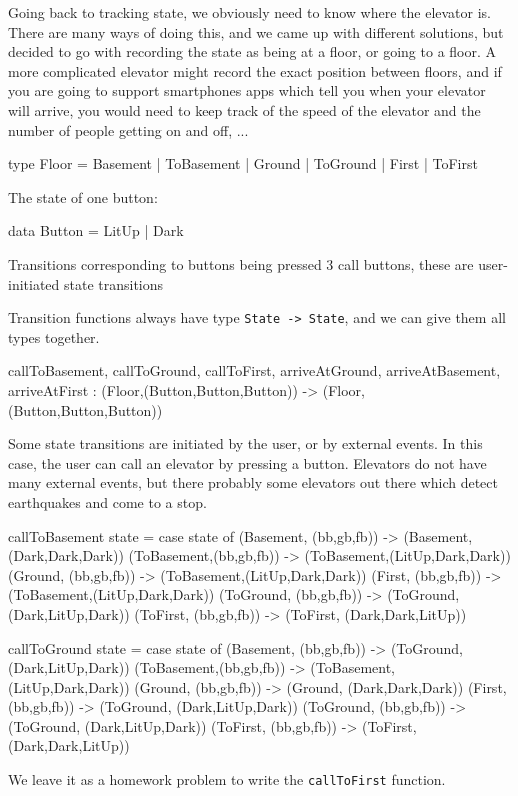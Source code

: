 \documentclass[12pt]{amsbook}
\begin{document}
\medskip

Going back to tracking state, we obviously need to know where the 
elevator is.  
There are many ways of doing this, and we came up with
different solutions, but decided to go with
recording the state as being at a floor, or going to a floor.
A more complicated elevator might record the exact position between
floors, 
and if you are going to support smartphones apps which tell you 
when your elevator will arrive, 
you would need to keep track of the speed of the elevator 
and the number of people getting on and off, ...
\vspace{-12pt}
\begin{code}
type Floor = Basement
           | ToBasement 
           | Ground 
           | ToGround
           | First
           | ToFirst
\end{code}

The state of one button:
\vspace{-12pt}
\begin{code}
data Button = LitUp | Dark
\end{code}

Transitions corresponding to buttons being pressed
3 call buttons, these are user-initiated state transitions

Transition functions always have type \verb|State -> State|,
and we can give them all types together.
\vspace{-12pt}
\begin{code}
callToBasement, callToGround, callToFirst, arriveAtGround, arriveAtBasement, arriveAtFirst
  : (Floor,(Button,Button,Button)) -> (Floor,(Button,Button,Button))
\end{code}

Some state transitions are initiated by the user, or by external events.
In this case, the user can call an elevator by pressing a button.
Elevators do not have many external events, but there probably some elevators
out there which detect earthquakes and come to a stop.
\vspace{-12pt}
\begin{code}
callToBasement state = case state of
  (Basement,  (bb,gb,fb))  -> (Basement,  (Dark,Dark,Dark))
  (ToBasement,(bb,gb,fb))  -> (ToBasement,(LitUp,Dark,Dark))
  (Ground,    (bb,gb,fb))  -> (ToBasement,(LitUp,Dark,Dark))
  (First,     (bb,gb,fb))  -> (ToBasement,(LitUp,Dark,Dark))
  (ToGround,  (bb,gb,fb))  -> (ToGround,  (Dark,LitUp,Dark))
  (ToFirst,   (bb,gb,fb))  -> (ToFirst,   (Dark,Dark,LitUp))

callToGround state = case state of
  (Basement,  (bb,gb,fb))  -> (ToGround,  (Dark,LitUp,Dark))
  (ToBasement,(bb,gb,fb))  -> (ToBasement,(LitUp,Dark,Dark))
  (Ground,    (bb,gb,fb))  -> (Ground,    (Dark,Dark,Dark))
  (First,     (bb,gb,fb))  -> (ToGround,  (Dark,LitUp,Dark))
  (ToGround,  (bb,gb,fb))  -> (ToGround,  (Dark,LitUp,Dark))
  (ToFirst,   (bb,gb,fb))  -> (ToFirst,   (Dark,Dark,LitUp))
\end{code}
We leave it as a homework problem to write the \verb|callToFirst| function.
\end{document}
